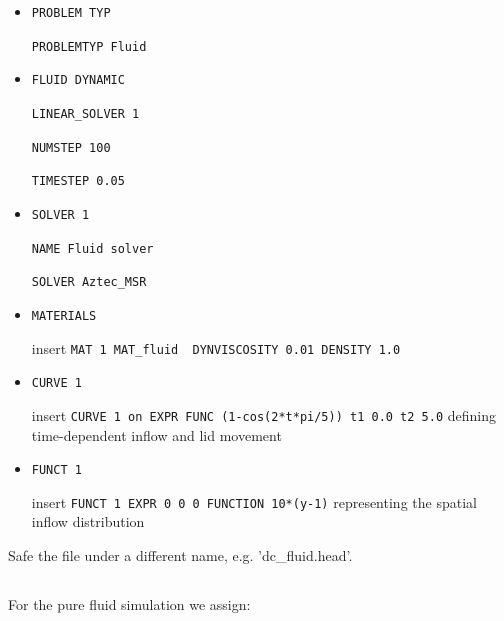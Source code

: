 \begin{itemize}
 \item \verb|PROBLEM TYP|

 \verb|PROBLEMTYP Fluid|

 \item \verb|FLUID DYNAMIC|

 \verb|LINEAR_SOLVER 1|

 \verb|NUMSTEP 100|

 \verb|TIMESTEP 0.05|

 \item \verb|SOLVER 1|
 
 \verb|NAME Fluid solver|

 \verb|SOLVER Aztec_MSR|

 \item \verb|MATERIALS|

  insert \verb|MAT 1 MAT_fluid  DYNVISCOSITY 0.01 DENSITY 1.0|

  \item \verb|CURVE 1|

  insert \verb|CURVE 1 on EXPR FUNC (1-cos(2*t*pi/5)) t1 0.0 t2 5.0| defining time-dependent inflow and lid movement
 
   \item \verb|FUNCT 1|

  insert \verb|FUNCT 1 EXPR 0 0 0 FUNCTION 10*(y-1)| representing the spatial inflow distribution

\end{itemize}
Safe the file under a different name, e.g. 'dc\_fluid.head'.

\subsection{\bc}
For the pure fluid simulation we assign:


